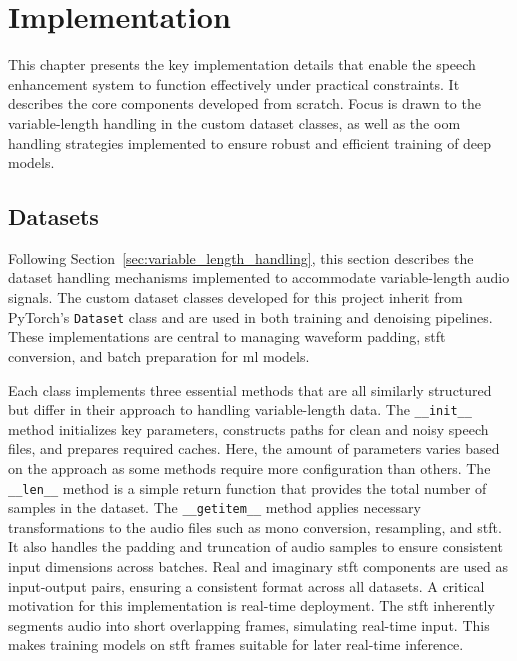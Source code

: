 \graphicspath{{content/chapters/6_implementation/figures/}}
\chapter{Implementation}
\label{chp:implementation}

This chapter presents the key implementation details that enable the speech enhancement system to function effectively under practical constraints. It describes the core components developed from scratch. Focus is drawn to the variable-length handling in the custom dataset classes, as well as the \gls{oom} handling strategies implemented to ensure robust and efficient training of deep models.

\section{Datasets}
\label{sec:datasets}

Following Section~\ref{sec:variable_length_handling}, this section describes the dataset handling mechanisms implemented to accommodate variable-length audio signals. The custom dataset classes developed for this project inherit from PyTorch’s \texttt{Dataset} class and are used in both training and denoising pipelines. These implementations are central to managing waveform padding, \gls{stft} conversion, and batch preparation for \gls{ml} models.

Each class implements three essential methods that are all similarly structured but differ in their approach to handling variable-length data. The \texttt{\_\_init\_\_} method initializes key parameters, constructs paths for clean and noisy speech files, and prepares required caches. Here, the amount of parameters varies based on the approach as some methods require more configuration than others. The \texttt{\_\_len\_\_} method is a simple return function that provides the total number of samples in the dataset. The \texttt{\_\_getitem\_\_} method applies necessary transformations to the audio files such as mono conversion, resampling, and \gls{stft}. It also handles the padding and truncation of audio samples to ensure consistent input dimensions across batches. Real and imaginary \gls{stft} components are used as input-output pairs, ensuring a consistent format across all datasets. A critical motivation for this implementation is real-time deployment. The \gls{stft} inherently segments audio into short overlapping frames, simulating real-time input. This makes training models on \gls{stft} frames suitable for later real-time inference.

